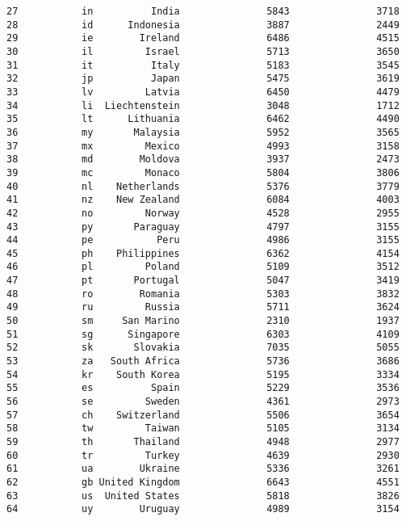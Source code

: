 \documentclass[
]{article}
\begin{document}
\begin{verbatim}
27           in          India               5843               3718
28           id      Indonesia               3887               2449
29           ie        Ireland               6486               4515
30           il         Israel               5713               3650
31           it          Italy               5183               3545
32           jp          Japan               5475               3619
33           lv         Latvia               6450               4479
34           li  Liechtenstein               3048               1712
35           lt      Lithuania               6462               4490
36           my       Malaysia               5952               3565
37           mx         Mexico               4993               3158
38           md        Moldova               3937               2473
39           mc         Monaco               5804               3806
40           nl    Netherlands               5376               3779
41           nz    New Zealand               6084               4003
42           no         Norway               4528               2955
43           py       Paraguay               4797               3155
44           pe           Peru               4986               3155
45           ph    Philippines               6362               4154
46           pl         Poland               5109               3512
47           pt       Portugal               5047               3419
48           ro        Romania               5303               3832
49           ru         Russia               5711               3624
50           sm     San Marino               2310               1937
51           sg      Singapore               6303               4109
52           sk       Slovakia               7035               5055
53           za   South Africa               5736               3686
54           kr    South Korea               5195               3334
55           es          Spain               5229               3536
56           se         Sweden               4361               2973
57           ch    Switzerland               5506               3654
58           tw         Taiwan               5105               3134
59           th       Thailand               4948               2977
60           tr         Turkey               4639               2930
61           ua        Ukraine               5336               3261
62           gb United Kingdom               6643               4551
63           us  United States               5818               3826
64           uy        Uruguay               4989               3154

\end{verbatim}
\end{document}
